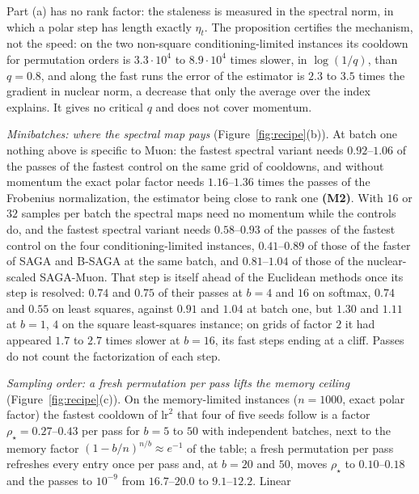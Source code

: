 \documentclass[10pt]{article}
\theoremstyle{remark}
\newcommand{\finding}[1]{\textbf{(#1)}}
\begin{document}
Part (a) has no rank factor: the staleness is measured in the spectral norm, in which a polar step has length exactly
$\eta_t$. The proposition certifies the mechanism, not the speed: on the two non-square conditioning-limited instances its
cooldown for permutation orders is $3.3\cdot10^4$ to $8.9\cdot10^4$ times slower, in $\log(1/q)$, than $q=0.8$, and along the fast runs the error
of the estimator is $2.3$ to $3.5$ times the gradient in nuclear norm, a decrease that only the average over the index
explains. It gives no critical $q$ and does not cover momentum.

\begin{description}[leftmargin=2.3em,labelwidth=2.0em,labelsep=0.3em,itemsep=1pt,topsep=3pt,parsep=0pt,font=\normalfont\bfseries]
\item[(M6)] \emph{Minibatches: where the spectral map pays} (Figure~\ref{fig:recipe}(b)). At batch one nothing above is
specific to Muon: the fastest spectral variant needs $0.92$--$1.06$ of the passes of the fastest control on the same
grid of cooldowns, and without momentum the exact polar factor needs $1.16$--$1.36$ times the passes of the Frobenius
normalization, the estimator being close to rank one \finding{M2}. With $16$ or $32$ samples per batch the spectral maps
need no momentum while the controls do, and the fastest spectral variant needs $0.58$--$0.93$ of the passes of the
fastest control on the four conditioning-limited instances, $0.41$--$0.89$ of those of the faster of SAGA and B-SAGA at
the same batch, and $0.81$--$1.04$ of those of the nuclear-scaled SAGA-Muon. That step is itself ahead of the Euclidean
methods once its step is resolved: $0.74$ and $0.75$ of their passes at $b=4$ and $16$ on softmax, $0.74$ and $0.55$ on
least squares, against $0.91$ and $1.04$ at batch one, but $1.30$ and $1.11$ at $b=1$, $4$ on the square least-squares
instance; on grids of factor $2$ it had appeared $1.7$ to $2.7$ times slower at $b=16$, its fast steps ending at a cliff.
Passes do not count the factorization of each step.
\item[(M7)] \emph{Sampling order: a fresh permutation per pass lifts the memory ceiling} (Figure~\ref{fig:recipe}(c)). On
the memory-limited instances ($n=1000$, exact polar factor) the fastest cooldown of $\mathrm{lr}^2$ that four of five seeds
follow is a factor $\rho_\star=0.27$--$0.43$ per pass for $b=5$ to $50$ with independent batches, next to the memory factor
$(1-b/n)^{n/b}\approx e^{-1}$ of the table; a fresh permutation per pass refreshes every entry once per pass and, at $b=20$
and $50$, moves $\rho_\star$ to $0.10$--$0.18$ and the passes to $10^{-9}$ from $16.7$--$20.0$ to $9.1$--$12.2$. Linear

\end{description}
\end{document}
